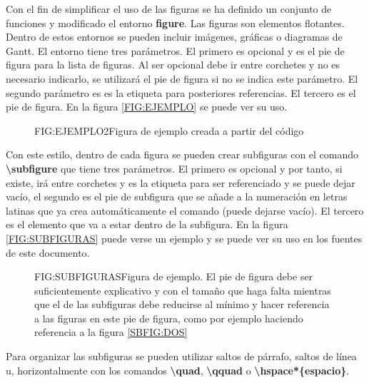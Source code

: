 Con el fin de simplificar el uso de las figuras se ha definido un conjunto de funciones y modificado el entorno \textbf{figure}. Las figuras son elementos flotantes. Dentro de estos entornos se pueden incluir imágenes, gráficas o diagramas de Gantt.
El entorno tiene tres parámetros. El primero es opcional y es el pie de figura para la lista de figuras. Al ser opcional debe ir entre corchetes y no es necesario indicarlo, se utilizará el pie de figura si no se indica este parámetro. El segundo parámetro es es la etiqueta para posteriores referencias. El tercero es el pie de figura. En la figura \ref{FIG:EJEMPLO} se puede ver su uso.

\begin{figure}[Ejemplo de uso de figure]{FIG:EJEMPLO2}{Figura de ejemplo creada a partir del código}
\end{figure}

Con este estilo, dentro de cada figura se pueden crear subfiguras con el comando \textbf{{\textbackslash}subfigure} que tiene tres parámetros. El primero es opcional y por tanto, si existe, irá entre corchetes y es la etiqueta para ser referenciado y se puede dejar vacío, el segundo es el pie de subfigura que se añade a la numeración en letras latinas que ya crea automáticamente el comando (puede dejarse vacío). El tercero es el elemento que va a estar dentro de la subfigura. En la figura \ref{FIG:SUBFIGURAS} puede verse un ejemplo y se puede ver su uso en los fuentes de este documento.

\begin{figure}[Ejemplo de uso de figure]{FIG:SUBFIGURAS}{Figura de ejemplo. El pie de figura debe ser suficientemente explicativo y con el tamaño que haga falta mientras que el de las subfiguras debe reducirse al mínimo y hacer referencia a las figuras en este pie de figura, como por ejemplo haciendo referencia a la figura \ref{SBFIG:DOS}}
   \quad
\end{figure}

Para organizar las subfiguras se pueden utilizar saltos de párrafo, saltos de línea u, horizontalmente con los comandos \textbf{\textbackslash quad}, \textbf{\textbackslash qquad} o \textbf{\textbackslash hspace*\{espacio\}}.
